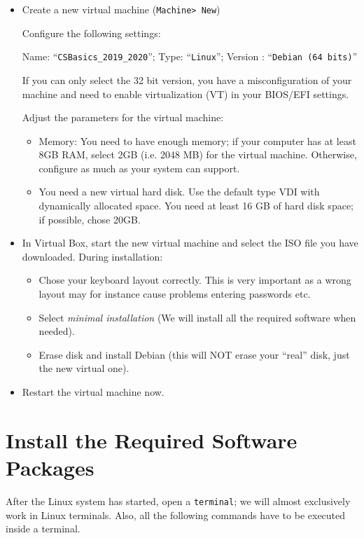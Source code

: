 \documentclass{scrartcl}
\begin{document}
\begin{itemize}
\item Create a new virtual machine (\texttt{Machine> New})

  Configure the following settings:

  Name: \enquote{\texttt{CSBasics\_2019\_2020}}; Type: \enquote{\texttt{Linux}}; Version : \enquote{\texttt{Debian (64 bits)}}

  If you can only select the 32 bit version, you have a misconfiguration of your machine and need to enable virtualization (VT) in your BIOS/EFI settings.

Adjust the parameters for the virtual machine:
\begin{itemize}
\item Memory: You need to have enough memory; if your computer has at
  least 8GB RAM, select 2GB (i.e. 2048 MB) for the virtual
  machine. Otherwise, configure as much as your system can support.

\item You need a new virtual hard disk. Use the default type VDI with dynamically allocated space.
You need at least 16 GB of hard disk space; if possible, chose 20GB.
\end{itemize}

\item In Virtual Box, start the new virtual machine and select the ISO file you have downloaded. During installation:


  \begin{itemize}
  \item Chose your keyboard layout correctly. This is very important as a wrong layout may for instance cause problems entering passwords etc.
  \item Select \emph{minimal installation} (We will install all the required software when needed).
  \item Erase disk and install Debian (this will NOT erase your \enquote{real} disk, just the new virtual one).
  \end{itemize}
\item Restart the virtual machine now.


\end{itemize}

\section{Install the Required Software Packages}
After the Linux system has started, open a \texttt{terminal}; we will almost exclusively work in Linux terminals. Also, all the following commands have to be executed inside a terminal.
\end{document}
